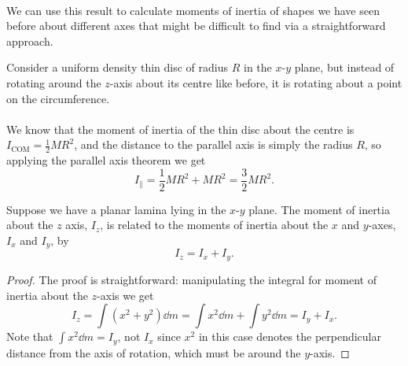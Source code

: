 \documentclass[../classical_mechanics.tex]{subfiles}
\begin{document}
        \paragraph{}
        We can use this result to calculate moments of inertia of shapes we have seen before about different axes that might be difficult to find via a straightforward approach.
        \begin{example}
            Consider a uniform density thin disc of radius $R$ in the $x$-$y$ plane, but instead of rotating around the $z$-axis about its centre like before, it is rotating about a point on the circumference.
            
            \paragraph{}
            We know that the moment of inertia of the thin disc about the centre is $I_\text{COM}=\frac{1}{2}MR^2$, and the distance to the parallel axis is simply the radius $R$, so applying the parallel axis theorem we get
            \begin{equation}
                I_\parallel=\frac{1}{2}MR^2+MR^2=\frac{3}{2}MR^2.
            \end{equation}
        \end{example}
        \begin{theorem}
            Suppose we have a planar lamina lying in the $x$-$y$ plane.
            The moment of inertia about the $z$ axis, $I_z$, is related to the moments of inertia about the $x$ and $y$-axes, $I_x$ and $I_y$, by
            \begin{equation}
                I_z=I_x+I_y.
            \end{equation}
        \end{theorem}
        \begin{proof}
            The proof is straightforward: manipulating the integral for moment of inertia about the $z$-axis we get
            \begin{equation}
                I_z=\int(x^2+y^2)\dd{m}=\int x^2\dd{m}+\int y^2\dd{m}=I_y+I_x.
            \end{equation}
            Note that $\int x^2\dd{m}=I_y$, not $I_x$ since $x^2$ in this case denotes the perpendicular distance from the axis of rotation, which must be around the $y$-axis.
        \end{proof}
\end{document}
